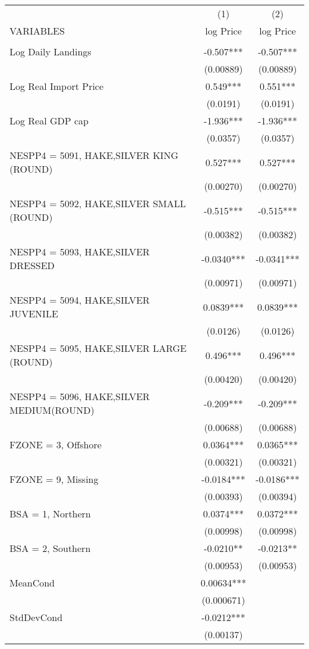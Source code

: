 \begin{tabular}{lcc} \hline
 & (1) & (2) \\
VARIABLES & log Price & log Price \\ \hline
 &  &  \\
Log Daily Landings & -0.507*** & -0.507*** \\
 & (0.00889) & (0.00889) \\
Log Real Import Price & 0.549*** & 0.551*** \\
 & (0.0191) & (0.0191) \\
Log Real GDP cap & -1.936*** & -1.936*** \\
 & (0.0357) & (0.0357) \\
NESPP4 = 5091, HAKE,SILVER KING (ROUND) & 0.527*** & 0.527*** \\
 & (0.00270) & (0.00270) \\
NESPP4 = 5092, HAKE,SILVER SMALL (ROUND) & -0.515*** & -0.515*** \\
 & (0.00382) & (0.00382) \\
NESPP4 = 5093, HAKE,SILVER DRESSED & -0.0340*** & -0.0341*** \\
 & (0.00971) & (0.00971) \\
NESPP4 = 5094, HAKE,SILVER JUVENILE & 0.0839*** & 0.0839*** \\
 & (0.0126) & (0.0126) \\
NESPP4 = 5095, HAKE,SILVER LARGE (ROUND) & 0.496*** & 0.496*** \\
 & (0.00420) & (0.00420) \\
NESPP4 = 5096, HAKE,SILVER MEDIUM(ROUND) & -0.209*** & -0.209*** \\
 & (0.00688) & (0.00688) \\
FZONE = 3, Offshore & 0.0364*** & 0.0365*** \\
 & (0.00321) & (0.00321) \\
FZONE = 9, Missing & -0.0184*** & -0.0186*** \\
 & (0.00393) & (0.00394) \\
BSA = 1, Northern & 0.0374*** & 0.0372*** \\
 & (0.00998) & (0.00998) \\
BSA = 2, Southern & -0.0210** & -0.0213** \\
 & (0.00953) & (0.00953) \\
MeanCond & 0.00634*** &  \\
 & (0.000671) &  \\
StdDevCond & -0.0212*** &  \\
 & (0.00137) &  \\

\end{tabular}
